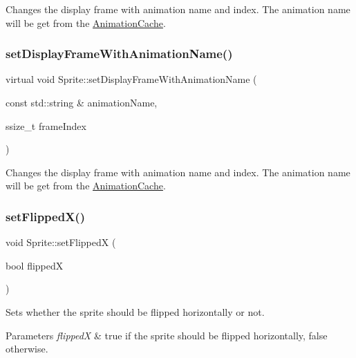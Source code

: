 Changes the display frame with animation name and index. The animation name will be get from the \hyperlink{classAnimationCache}{Animation\+Cache}. \mbox{\label{classSprite_a6c97feaea8f275c0233ad8e55743b0c5}} 
\subsubsection{\texorpdfstring{set\+Display\+Frame\+With\+Animation\+Name()}{setDisplayFrameWithAnimationName()}\hspace{0.1cm}{\footnotesize\ttfamily [2/2]}}
{\footnotesize\ttfamily virtual void Sprite\+::set\+Display\+Frame\+With\+Animation\+Name (\begin{DoxyParamCaption}\item[{const std\+::string \&}]{animation\+Name,  }\item[{ssize\+\_\+t}]{frame\+Index }\end{DoxyParamCaption})\hspace{0.3cm}{\ttfamily [virtual]}}

Changes the display frame with animation name and index. The animation name will be get from the \hyperlink{classAnimationCache}{Animation\+Cache}. \mbox{\label{classSprite_ad18ebe3330284f096db0fc6e16839633}} 
\subsubsection{\texorpdfstring{set\+Flipped\+X()}{setFlippedX()}\hspace{0.1cm}{\footnotesize\ttfamily [1/2]}}
{\footnotesize\ttfamily void Sprite\+::set\+FlippedX (\begin{DoxyParamCaption}\item[{bool}]{flippedX }\end{DoxyParamCaption})}

Sets whether the sprite should be flipped horizontally or not.


\begin{DoxyParams}{Parameters}
{\em flippedX} & true if the sprite should be flipped horizontally, false otherwise. \\
\hline
\end{DoxyParams}
\mbox{\label{classSprite_ad18ebe3330284f096db0fc6e16839633}} 

